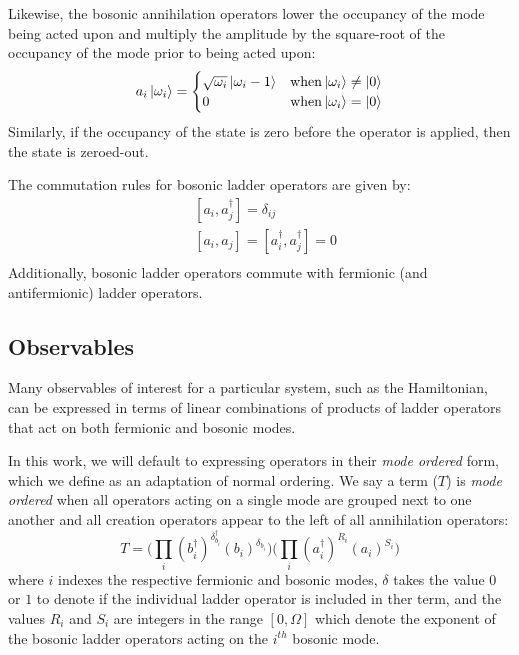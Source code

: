 Likewise, the bosonic annihilation operators lower the occupancy of the mode being acted upon and multiply the amplitude by the square-root of the occupancy of the mode prior to being acted upon:
\begin{equation}
    \label{eq:bosonic-annihilation}
    a_i \ket{\omega_i} = 
    \begin{cases} 
        \sqrt{\omega_i} \ket{\omega_i - 1}  & {\rm when} \ket{\omega_i} \neq \ket{0} \\
        0 & {\rm when} \ket{\omega_i} = \ket{0}
    \end{cases}
\end{equation}
Similarly, if the occupancy of the state is zero before the operator is applied, then the state is zeroed-out.

The commutation rules for bosonic ladder operators are given by:
\begin{equation}
    \label{eq:bosonic-commutation}
    \begin{split}
        &[a_i, a_j^\dagger] = \delta_{ij}\\
        & [a_i, a_j] = [a_i^\dagger, a_j^\dagger] = 0 \\
    \end{split}
\end{equation}
Additionally, bosonic ladder operators commute with fermionic (and antifermionic) ladder operators.

\subsection{Observables}
\label{subsec:observables}

Many observables of interest for a particular system, such as the Hamiltonian, can be expressed in terms of linear combinations of products of ladder operators that act on both fermionic and bosonic modes.

In this work, we will default to expressing operators in their \emph{mode ordered} form, which we define as an adaptation of normal ordering.
We say a term ($T$) is \textit{mode ordered} when all operators acting on a single mode are grouped next to one another and all creation operators appear to the left of all annihilation operators:
\begin{equation}
    \label{eq:mode-ordered}
    T = \Big( \prod_i (b_i^\dagger)^{\delta_{b_i}^{\dagger}} (b_i)^{\delta_{b_i}} \Big) \Big( \prod_i (a_i^\dagger)^{R_i}(a_i)^{S_i} \Big) 
\end{equation}
where $i$ indexes the respective fermionic and bosonic modes, $\delta$ takes the value $0$ or $1$ to denote if the individual ladder operator is included in ther term, and the values $R_i$ and $S_i$ are integers in the range $[0, \Omega]$ which denote the exponent of the bosonic ladder operators acting on the $i^{th}$ bosonic mode.

